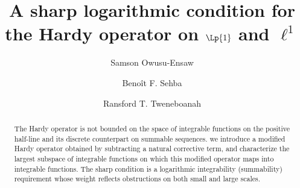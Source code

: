 \documentclass[12pt,a4paper]{amsart}
\title{A sharp logarithmic condition for the Hardy operator
on $\Lp{1}$ and $\ell^1$}
\author {Samson Owusu-Ensaw}
\author {Beno\^it F. Sehba}
\author {Ransford T. Tweneboanah}
\date{}
\theoremstyle{definition}
\begin{document}
\maketitle

\begin{abstract}
The Hardy operator is not bounded on the space of integrable
functions on the positive half-line and its discrete counterpart on summable
sequences.
we introduce a modified Hardy operator obtained by
subtracting a natural corrective term, and characterize the largest
subspace of integrable functions on which this modified operator maps
into integrable functions. The sharp condition is a logarithmic
integrability (summability) requirement whose weight reflects obstructions on both
small and large scales. 
\end{abstract}


\end{document}
